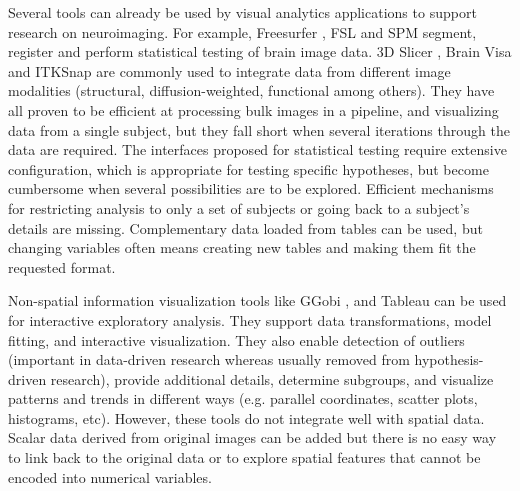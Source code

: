 \documentclass[twocolumn]{svjour3}
\begin{document}
Several tools can already be used by visual analytics applications to support research on neuroimaging. For example, Freesurfer \cite{fischl_freesurfer_2012}, FSL \cite{jenkinson_fsl_2012} and SPM \cite{friston_statistical_2006} segment, register and perform statistical testing of brain image data. 3D Slicer \cite{fedorov_3d_2012}, Brain Visa \cite{cointepas_brainvisa:_2001} and ITKSnap \cite{yushkevich_user-guided_2006} are commonly used to integrate data from different image modalities (structural, diffusion-weighted, functional among others). They have all proven to be efficient at processing bulk images in a pipeline, and visualizing data from a single subject, but they fall short when several iterations through the data are required. The interfaces proposed for statistical testing require extensive configuration, which is appropriate for testing specific hypotheses, but become cumbersome when several possibilities are to be explored. Efficient mechanisms for restricting analysis to only a set of subjects or going back to a subject's details are missing. Complementary data loaded from tables can be used, but changing variables often means creating new tables and making them fit the requested format.


Non-spatial information visualization tools like GGobi \cite{cook_interactive_2007}, and Tableau\cite{hanrahan_tableau_2003} can be used for interactive exploratory analysis. They support data transformations, model fitting, and interactive visualization. They also enable  detection of outliers (important in data-driven research whereas usually removed from hypothesis-driven research), provide additional details, determine subgroups, and visualize patterns and trends in different ways (e.g. parallel coordinates, scatter plots, histograms, etc). However, these tools do not integrate well with spatial data. Scalar data derived from original images can be added but there is no easy way to link back to the original data or to explore spatial features that cannot be encoded into numerical variables.

\end{document}
